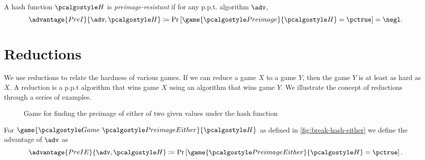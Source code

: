 \begin{definition}
  A hash function $\algo{H}$ is \emph{preimage-resistant} if for any p.p.t. algorithm $\adv$,
 \[
  \advantage{PreI}{\adv, \algo{H}} \defeq \pr{\game{\algo{Preimage}}{\algo{H}} = \pctrue} = \negl.
 \]
\end{definition}



\section{Reductions}
We use reductions to relate the hardness of various games.
If we can reduce a game $X$ to a game $Y$, then the game $Y$ is at least as hard as $X$.
A reduction is a p.p.t algorithm that wins game $X$ using an algorithm that wins game $Y$.
We illustrate the concept of reductions through a series of examples.

\begin{figure}[tbhp]
  \begin{center}
    \begin{tcolorbox}[width=7cm]
      \begin{pchstack}[center]
      \end{pchstack}
    \end{tcolorbox}
  \end{center}
  \caption{Game for finding the preimage of either of two given values under the hash function \label{fig:break-hash-either}}
\end{figure}


\begin{definition}
  For $\game{\Game~\algo{PreimageEither}}{\algo{H}}$ as defined in \autoref{fig:break-hash-either} we define the advantage of $\adv$ as
 \[
  \advantage{PreIE}{\adv, \algo{H}} \defeq \pr{\game{\algo{PreimageEither}}{\algo{H}} = \pctrue}.
 \]
\end{definition}

